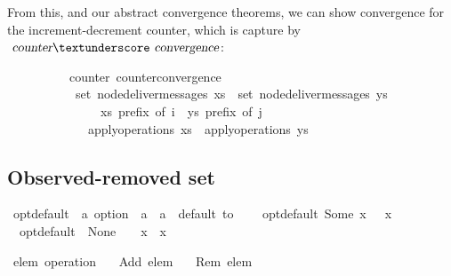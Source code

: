\vspace{0.375em}
From this, and our abstract convergence theorems, we can show convergence for the increment-decrement counter, which is capture by $\isa{counter}{\isacharunderscore}\isa{convergence}$:
\vspace{0.375em}
\begin{isabellebody}
\ \ \ \ \ \ \ \ \ {\isacharparenleft}\ counter{\isacharparenright}\ counter{\isacharunderscore}convergence{\isacharcolon}\isanewline
\ \ \ \ \ \ \ \ \ \ \ {\isachardoublequoteopen}set\ {\isacharparenleft}node{\isacharunderscore}deliver{\isacharunderscore}messages\ xs{\isacharparenright}\ {\isacharequal}\ set\ {\isacharparenleft}node{\isacharunderscore}deliver{\isacharunderscore}messages\ ys{\isacharparenright}{\isachardoublequoteclose}\isanewline
\ \ \ \ \ \ \ \ \ \ \ \ \ \ \ {\isachardoublequoteopen}xs\ prefix\ of\ i{\isachardoublequoteclose}\ \ {\isachardoublequoteopen}ys\ prefix\ of\ j{\isachardoublequoteclose}\isanewline
\ \ \ \ \ \ \ \ \ \ \ \ \ {\isachardoublequoteopen}apply{\isacharunderscore}operations\ xs\ {\isacharequal}\ apply{\isacharunderscore}operations\ ys{\isachardoublequoteclose}\isanewline
\end{isabellebody}

\subsection{Observed-removed set}
\label{subsect.observed-removed.set}

\begin{isabellebody}
\isamarkupfalse%
\ opt{\isacharunderscore}default\ {\isacharcolon}{\isacharcolon}\ {\isachardoublequoteopen}{\isacharprime}a\ option\ {\isasymRightarrow}\ {\isacharprime}a\ {\isasymRightarrow}\ {\isacharprime}a{\isachardoublequoteclose}\ {\isacharparenleft}\ {\isachardoublequoteopen}default\ to{\isachardoublequoteclose}\ {}{}{\isacharparenright}\ \isanewline
\ \ {\isachardoublequoteopen}opt{\isacharunderscore}default\ {\isacharparenleft}Some\ x{\isacharparenright}\ {\isacharunderscore}\ {\isacharequal}\ x{\isachardoublequoteclose}\ {\isacharbar}\isanewline
\ \ {\isachardoublequoteopen}opt{\isacharunderscore}default\ \ None\ \ \ \ x\ {\isacharequal}\ x{\isachardoublequoteclose}\isanewline
\end{isabellebody}

\begin{isabellebody}
\isamarkupfalse%
\ {\isacharprime}elem\ operation\isanewline
\ \ {\isacharequal}\ Add\ {\isacharprime}elem\isanewline
\ \ {\isacharbar}\ Rem\ {\isacharprime}elem\isanewline
\end{isabellebody}

